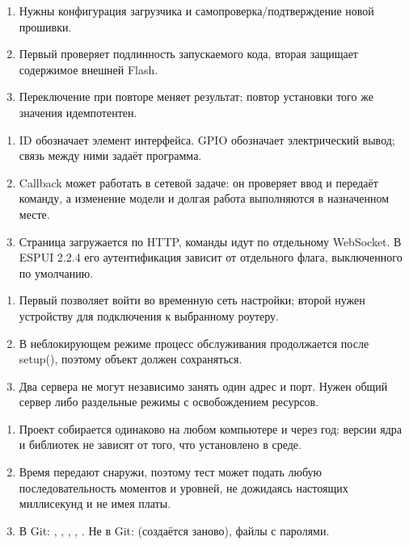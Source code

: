 \begin{enumerate}
\item Нужны конфигурация загрузчика и самопроверка/подтверждение новой прошивки.
\item Первый проверяет подлинность запускаемого кода, вторая защищает содержимое внешней Flash.
\item Переключение при повторе меняет результат; повтор установки того же значения идемпотентен.
\end{enumerate}

\begin{enumerate}
  \item ID обозначает элемент интерфейса. GPIO обозначает электрический вывод; связь между ними задаёт программа.
  \item Callback может работать в сетевой задаче: он проверяет ввод и передаёт команду, а изменение модели и долгая работа выполняются в назначенном месте.
  \item Страница загружается по HTTP, команды идут по отдельному WebSocket. В ESPUI 2.2.4 его аутентификация зависит от отдельного флага, выключенного по умолчанию.
\end{enumerate}

\begin{enumerate}
  \item Первый позволяет войти во временную сеть настройки; второй нужен устройству для подключения к выбранному роутеру.
  \item В неблокирующем режиме процесс обслуживания продолжается после setup(), поэтому объект должен сохраняться.
  \item Два сервера не могут независимо занять один адрес и порт. Нужен общий сервер либо раздельные режимы с освобождением ресурсов.
\end{enumerate}

\begin{enumerate}
  \item Проект собирается одинаково на любом компьютере и через год: версии ядра и библиотек не зависят от того, что установлено в среде.
  \item Время передают снаружи, поэтому тест может подать любую последовательность моментов и уровней, не дожидаясь настоящих миллисекунд и не имея платы.
  \item В Git: , , , , . Не в Git:  (создаётся заново), файлы с паролями.
\end{enumerate}

